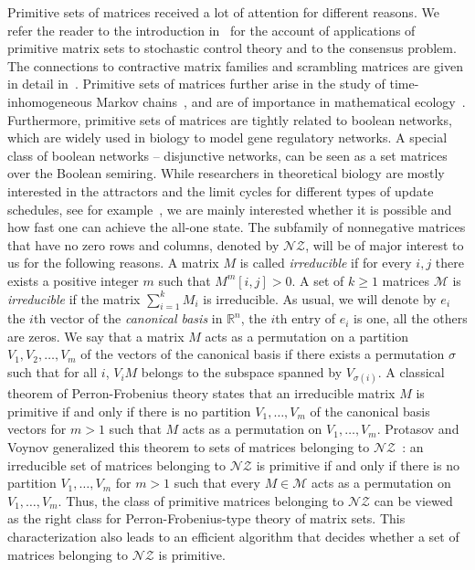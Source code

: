\documentclass[a4paper,USenglish]{lipics}
\theoremstyle{definition}
\begin{document}
Primitive sets of matrices received a lot of attention for different reasons. We refer the reader to the introduction in~\cite{BJO15} for the account of applications of primitive matrix sets to stochastic control theory and to the consensus problem. The connections to contractive matrix families and scrambling matrices are given in detail in~\cite[Section 5]{PrVo2012}. Primitive sets of matrices further arise in the study of time-inhomogeneous Markov chains~\cite{Hart02}, and are of importance in mathematical ecology~\cite{Log10}.
Furthermore, primitive sets of matrices are tightly related to boolean networks, which are widely used in biology to model gene regulatory networks. A special class of boolean networks -- disjunctive networks, can be seen as a set matrices over the Boolean semiring.
While researchers in theoretical biology are mostly interested in the attractors and the limit cycles for different types of update schedules, see for example~\cite{GoNo12}, we are mainly interested whether it is possible and how fast one can achieve the all-one state. 
The subfamily of nonnegative matrices that have no zero rows and columns, denoted by $\mathscr{NZ}$, will be of major interest to us for the following reasons. A matrix $M$ is called \emph{irreducible} if for every $i,j$ there exists a positive integer $m$ such that $M^{m}[i,j]>0$. A set of $k \geq 1$ matrices $\mathcal{M}$ is \emph{irreducible} if the matrix $\sum_{i=1}^{k} M_i$ is irreducible. As usual, we will denote by $e_i$ the $i$th vector of the \emph{canonical basis} in $\mathbb{R}^n$, the $i$th entry of $e_i$ is one, all the others are zeros. We say that a matrix $M$ acts as a permutation on a partition $V_1, V_2, \ldots, V_m$ of the vectors of the canonical basis if there exists a permutation $\sigma$ such that for all $i$, $V_i M$ belongs to the subspace spanned by $V_{\sigma(i)}$. A classical theorem of Perron-Frobenius theory states that an irreducible matrix $M$ is primitive if and only if there is no partition $V_1, \ldots, V_m$ of the canonical basis vectors for $m>1$ such that $M$ acts as a permutation on $V_1, \ldots, V_m$. Protasov and Voynov generalized this theorem to sets of matrices belonging to $\mathscr{NZ}$~\cite{PrVo2012}: an irreducible set of matrices belonging to $\mathscr{NZ}$ is primitive if and only if there is no partition $V_1, \ldots, V_m$ for $m>1$ such that every $M \in \mathcal{M}$ acts as a permutation on $V_1, \ldots, V_m$. Thus, the class of primitive matrices belonging to $\mathscr{NZ}$ can be viewed as the right class for Perron-Frobenius-type theory of matrix sets. This characterization also leads to an efficient algorithm that decides whether a set of matrices belonging to $\mathscr{NZ}$ is primitive.
\end{document}
